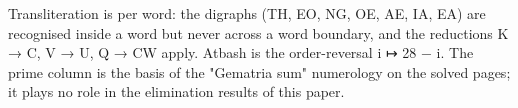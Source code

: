 \documentclass[11pt]{article}
\begin{document}
Transliteration is per word: the digraphs (TH, EO, NG, OE, AE, IA, EA) are recognised inside a word but never across a word boundary, and the reductions K → C, V → U, Q → CW apply. Atbash is the order-reversal i ↦ 28 − i. The prime column is the basis of the "Gematria sum" numerology on the solved pages; it plays no role in the elimination results of this paper.
\end{document}
